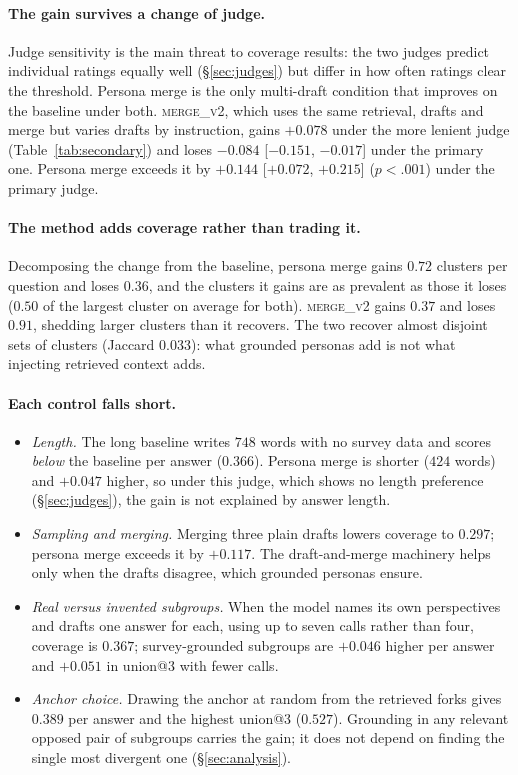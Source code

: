 \documentclass[11pt]{article}
\begin{document}
\paragraph{The gain survives a change of judge.}
Judge sensitivity is the main threat to coverage results: the two judges
predict individual ratings equally well (\S\ref{sec:judges}) but differ in how
often ratings clear the threshold. Persona merge is the only multi-draft
condition that improves on the baseline under both. \textsc{merge\_v2}, which
uses the same retrieval, drafts and merge but varies drafts by instruction,
gains $+0.078$ under the more lenient judge (Table~\ref{tab:secondary}) and
loses $-0.084$
[$-0.151$, $-0.017$] under the primary one. Persona merge exceeds it by
$+0.144$ [$+0.072$, $+0.215$] ($p < .001$) under the primary judge.

\paragraph{The method adds coverage rather than trading it.}
Decomposing the change from the baseline, persona merge gains $0.72$ clusters
per question and loses $0.36$, and the clusters it gains are as prevalent as
those it loses ($0.50$ of the largest cluster on average for both).
\textsc{merge\_v2} gains $0.37$ and loses $0.91$, shedding larger clusters than
it recovers. The two recover almost disjoint sets of clusters
(Jaccard $0.033$): what grounded personas add is not what injecting retrieved
context adds.

\paragraph{Each control falls short.}
\begin{itemize}
  \item \emph{Length.} The long baseline writes $748$ words with no survey data
  and scores \emph{below} the baseline per answer ($0.366$). Persona merge is
  shorter ($424$ words) and $+0.047$ higher, so under this judge, which shows
  no length preference (\S\ref{sec:judges}), the gain is not explained by
  answer length.
  \item \emph{Sampling and merging.} Merging three plain drafts lowers coverage
  to $0.297$; persona merge exceeds it by $+0.117$. The draft-and-merge
  machinery helps only when the drafts disagree, which grounded personas
  ensure.
  \item \emph{Real versus invented subgroups.} When the model names its own
  perspectives and drafts one answer for each, using up to seven calls rather
  than four, coverage is $0.367$; survey-grounded subgroups are $+0.046$
  higher per answer and $+0.051$ in union@3 with fewer calls.
  \item \emph{Anchor choice.} Drawing the anchor at random from the retrieved
  forks gives $0.389$ per answer and the highest union@3 ($0.527$). Grounding
  in any relevant opposed pair of subgroups carries the gain; it does not
  depend on finding the single most divergent one (\S\ref{sec:analysis}).
\end{itemize}
\end{document}
